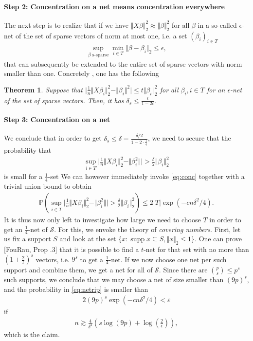 \documentclass{article}
\DeclareMathOperator{\supp}{\mathrm{supp}}
\newcommand{\calS}{\mathcal{S}}
\newcommand{\sse}{\subseteq}
\newtheorem{theorem}{Theorem}
\newcommand{\abs}[1]{\vert #1 \vert}
\newcommand{\norm}[1]{\Vert #1 \Vert}
\begin{document}
\paragraph{Step 2: Concentration on a net means concentration everywhere}
The next step is to realize that if we have $\norm{X\beta}_2^2 \approx \norm{\beta}_2^2$ for all $\beta$ in a so-called $\epsilon$-net of the set of sparse vectors of norm at most one, i.e. a set $(\beta_i)_{i \in T}$
\begin{align*}
    \sup_{\beta \text{ s-sparse}} \min_{i \in T} \norm{\beta-\beta_i}_2 \leq \epsilon,
\end{align*}
that can subsequently be extended to the entire set of sparse vectors with norm smaller than one. Concretely , one has the following
\begin{theorem}
    Suppose that $\abs{\frac{1}{n} \norm{X\beta_i}_2^2 - \norm{\beta_i}^2} \leq t\norm{\beta_i}_2^2$ for all $\beta_i, i \in T$ for an $\epsilon$-net of the set of sparse vectors. Then, it has $\delta_s \leq \frac{t}{1-2\epsilon}$.
\end{theorem}

\paragraph{Step 3: Concentration on a net} We conclude that in order to get $\delta_s \leq \delta = \tfrac{\delta/2}{1-2\cdot\tfrac{1}{4}}$, we need to secure that the probability that 
\begin{align*}
    \sup_{i \in T} \abs{\frac{1}{n} \norm{X\beta_i}_2^2 - \norm{\beta_i^2}} >\tfrac{\delta}{2}\norm{\beta_i}^2_2
\end{align*}
is small for a $\tfrac{1}{4}$-set We can however immediately invoke \eqref{eq:conc} together with a trivial union bound to obtain
\begin{align}
    \mathbb{P}\left( \sup_{i \in T} \abs{\frac{1}{n} \norm{X\beta_i}_2^2 - \norm{\beta_i^2}} >\frac{\delta}{2}\norm{\beta_i}^2_2 \right) \leq 2\abs{T}\exp(-cn\delta^2/4). \label{eq:netrip}
\end{align}
It is thus now only left to investigate how large we need to choose $T$ in order to get an $\tfrac{1}{4}$-net of $\calS$. For this, we envoke the theory of \emph{covering numbers}. First, let us fix a support $S$ and look at the set $\{x : \supp x \sse S, \norm{x}_2 \leq 1\}$. One can prove [FouRau, Prop .3] that it is possible to find a $t$-net for that set with no more than $(1+\frac{2}{t})^s$ vectors, i.e. $9^s$ to get a $\tfrac{1}{4}$-net. If we now choose one net per such support and combine them, we get a net for all of $\mathcal{S}$. Since there are $\binom{p}{s}\leq p^s$ such supports, we conclude that we may choose a net of size smaller than $(9p)^s$, and the probability in \eqref{eq:netrip} is smaller than
\begin{align*}
    2(9p)^s\exp(-cn\delta^2/4) <\varepsilon
\end{align*}
if 
\begin{align*}
    n \gtrsim \frac{4}{\delta^2}(s\log(9p) + \log(\tfrac{2}{\epsilon})),
\end{align*}
which is the claim.
\end{document}
